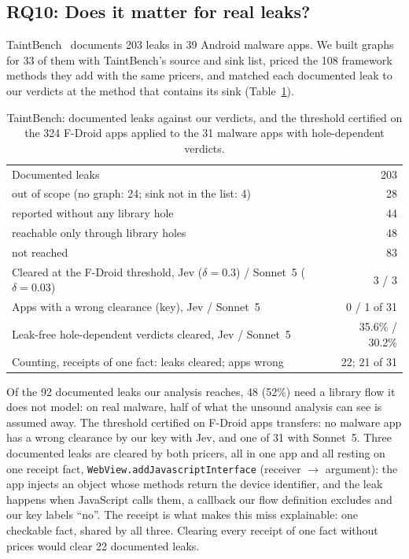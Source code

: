 \subsection{RQ10: Does it matter for real leaks?}
\label{sec:rq10}
TaintBench~\cite{taintbench} documents 203 leaks in 39 Android malware apps.
We built graphs for 33 of them with TaintBench's source and sink list, priced the 108 framework methods they add with the same pricers, and matched each documented leak to our verdicts at the method that contains its sink (Table~\ref{tab:taintbench}).
\begin{table}[t]
\caption{TaintBench: documented leaks against our verdicts, and the threshold certified on the 324 F-Droid apps applied to the 31 malware apps with hole-dependent verdicts.}
\label{tab:taintbench}
\small
\begin{tabular}{@{}lr@{}}
\toprule
Documented leaks & 203\\
\quad out of scope (no graph: 24; sink not in the list: 4) & 28\\
\quad reported without any library hole & 44\\
\quad reachable only through library holes & 48\\
\quad not reached & 83\\
\midrule
Cleared at the F-Droid threshold, Jev ($\delta=0.3$) / Sonnet~5 ($\delta=0.03$) & 3 / 3\\
Apps with a wrong clearance (key), Jev / Sonnet~5 & 0 / 1 of 31\\
Leak-free hole-dependent verdicts cleared, Jev / Sonnet~5 & 35.6\% / 30.2\%\\
Counting, receipts of one fact: leaks cleared; apps wrong & 22; 21 of 31\\
\bottomrule
\end{tabular}
\end{table}
Of the 92 documented leaks our analysis reaches, 48 (52\%) need a library flow it does not model: on real malware, half of what the unsound analysis can see is assumed away.
The threshold certified on F-Droid apps transfers: no malware app has a wrong clearance by our key with Jev, and one of 31 with Sonnet~5.
Three documented leaks are cleared by both pricers, all in one app and all resting on one receipt fact, \texttt{WebView.addJavascriptInterface} (receiver $\to$ argument): the app injects an object whose methods return the device identifier, and the leak happens when JavaScript calls them, a callback our flow definition excludes and our key labels ``no''.
The receipt is what makes this miss explainable: one checkable fact, shared by all three.
Clearing every receipt of one fact without prices would clear 22 documented leaks.
